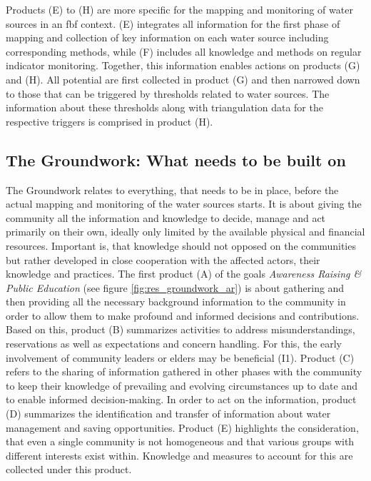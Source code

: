 Products (E) to (H) are more specific for the mapping and monitoring of water sources in an \acrshort{fbf} context. (E) integrates all information for the first phase of mapping and collection of key information on each water source including corresponding methods, while (F) includes all knowledge and methods on regular indicator monitoring. Together, this information enables actions on products (G) and (H). All potential  are first collected in product (G) and then narrowed down to those that can be triggered by thresholds related to water sources. The information about these thresholds along with triangulation data for the respective triggers is comprised in product (H).


\subsection{The Groundwork: What needs to be built on}\label{subsubsec:groundwork}
The Groundwork relates to everything, that needs to be in place, before the actual mapping and monitoring of the water sources starts. It is about giving the community all the information and knowledge to decide, manage and act primarily on their own, ideally only limited by the available physical and financial resources. Important is, that knowledge should not opposed on the communities but rather developed in close cooperation with the affected actors, their knowledge and practices. The first product (A) of the goals \textit{Awareness Raising \& Public Education} (see figure \ref{fig:res_groundwork_ar}) is about gathering and then providing all the necessary background information to the community in order to allow them to make profound and informed decisions and contributions. Based on this, product (B) summarizes activities to address misunderstandings, reservations as well as expectations and concern handling. For this, the early involvement of community leaders or elders may be beneficial (I1). Product (C) refers to the sharing of information gathered in other phases with the community to keep their knowledge of prevailing and evolving circumstances up to date and to enable informed decision-making. In order to act on the information, product (D) summarizes the identification and transfer of information about water management and saving opportunities. Product (E) highlights the consideration, that even a single community is not homogeneous and that various groups with different interests exist within. Knowledge and measures to account for this are collected under this product.

